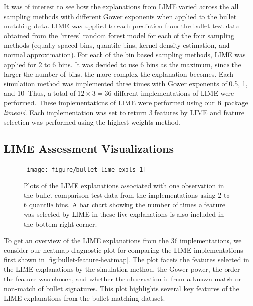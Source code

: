 \documentclass[AMS,STIX2COL]{WileyNJD-v2}\usepackage[]{graphicx}\usepackage[]{color}
\newenvironment{knitrout}{}{} %
\begin{document}
{It was of interest to see how the explanations from LIME varied across the all sampling methods with different Gower exponents when applied to the bullet matching data. LIME was applied to each prediction from the bullet test data obtained from the 'rtrees' random forest model for each of the four sampling methods (equally spaced bins, quantile bins, kernel density estimation, and normal approximation). For each of the bin based sampling methods, LIME was applied for 2 to 6 bins. It was decided to use 6 bins as the maximum, since the larger the number of bins, the more complex the explanation becomes. Each simulation method was implemented three times with Gower exponents of 0.5, 1, and 10. Thus, a total of $12\times 3=36$ different implementations of LIME were performed. These implementations of LIME were performed using our R package \emph{limeaid}. Each implementation was set to return 3 features by LIME and feature selection was performed using the highest weights method.

\subsection{LIME Assessment Visualizations}

\begin{figure}[!t]
\begin{knitrout}
\color{fgcolor}
\texttt{[image: figure/bullet-lime-expls-1]} 

\end{knitrout}
\caption{Plots of the LIME explanations associated with one observation in the bullet comparison test data from the implementations using 2 to 6 quantile bins. A bar chart showing the number of times a feature was selected by LIME in these five explanations is also included in the bottom right corner.}
\label{fig:bullet-lime-expls}
\end{figure}

To get an overview of the LIME explanations from the 36 implementations, we consider our heatmap diagnostic plot for comparing the LIME implementations first shown in \autoref{fig:bullet-feature-heatmap}. The plot facets the features selected in the LIME explanations by the simulation method, the Gower power, the order the feature was chosen, and whether the observation is from a known match or non-match of bullet signatures. This plot highlights several key features of the LIME explanations from the bullet matching dataset.

}
\end{document}
